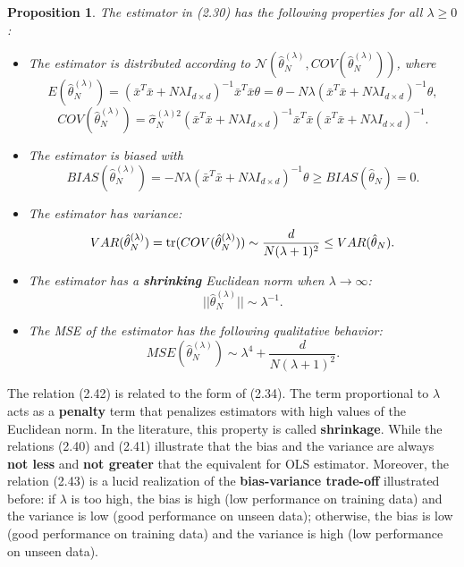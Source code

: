 \documentclass{report}
\newtheorem{proposition}{Proposition}[chapter]
\begin{document}
\begin{proposition}
The estimator in (2.30) has the following properties for all $\lambda \geq 0$:
\begin{itemize}
\item The estimator is distributed according to $\mathcal{N}(\hat{\theta}_N^{(\lambda)}, COV(\hat{\theta}_N^{(\lambda)}))$, where 
\begin{equation}
E(\hat{\theta}_N^{(\lambda)}) =  (\bar{x}^T\bar{x}+N\lambda I_{d\times d})^{-1}\bar{x}^T\bar{x}\theta = \theta -N\lambda (\bar{x}^T\bar{x}+N\lambda I_{d\times d})^{-1}\theta,
\end{equation}
\begin{equation}
COV(\hat{\theta}_N^{(\lambda)}) =\hat{\sigma}_N^{(\lambda)2} (\bar{x}^T\bar{x}+N\lambda I_{d\times d})^{-1}\bar{x}^T\bar{x}(\bar{x}^T\bar{x}+N\lambda I_{d\times d})^{-1}.
\end{equation}
\item The estimator is biased with
\begin{equation}
BIAS(\hat{\theta}_N^{(\lambda)}) = -N\lambda (\bar{x}^T\bar{x}+N\lambda I_{d\times d})^{-1}\theta \geq BIAS(\hat{\theta}_N) = 0.
\end{equation}
\item The estimator has variance:
\begin{equation}
VAR(\hat{\theta}_N^{(\lambda)}) = \textup{tr}(COV(\hat{\theta}_N^{(\lambda)})) \sim \frac{d}{N(\lambda + 1)^2} \leq VAR(\hat{\theta}_N).
\end{equation}
\item The estimator has a \textbf{shrinking} Euclidean norm when $\lambda \to \infty$:
\begin{equation}
||\hat{\theta}_N^{(\lambda)}|| \sim \lambda^{-1}.
\end{equation}
\item The MSE of the estimator has the following qualitative behavior:
\begin{equation}
MSE(\hat{\theta}_N^{(\lambda)}) \sim \lambda^4 +  \frac{d}{N(\lambda + 1)^2}.
\end{equation}
\end{itemize}
\end{proposition}

The relation (2.42) is related to the form of (2.34). The term proportional to $\lambda$ acts as a \textbf{penalty} term that penalizes estimators with high values of the Euclidean norm. In the literature, this property is called \textbf{shrinkage}. While the relations (2.40) and (2.41) illustrate that the bias and the variance are always \textbf{not less} and \textbf{not greater} that the equivalent for OLS estimator. Moreover, the relation (2.43) is a lucid realization of the \textbf{bias-variance trade-off} illustrated before: if $\lambda$ is too high, the bias is high (low performance on training data) and the variance is low (good performance on unseen data); otherwise, the bias is low (good performance on training data) and the variance is high (low performance on unseen data).
\end{document}
